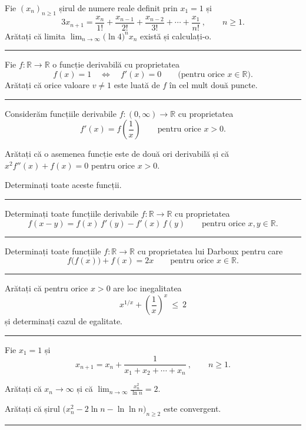 Fie $(x_n)_{n\ge1}$ șirul de numere reale definit prin $x_1=1$ și
\[ 3x_{n+1}=\frac{x_n}{1!}+\frac{x_{n-1}}{2!}+\frac{x_{n-2}}{3!}+\cdots+\frac{x_1}{n!}\ ,\qquad n\ge1 . \]
Arătați că limita $\displaystyle\lim_{n\to\infty}\bigl(\ln4\bigr)^{n}x_n$ există și calculați-o.
\vspace{1mm}\hrule

Fie $f:\mathbb{R}\to\mathbb{R}$ o funcție derivabilă cu proprietatea
\[ f(x)=1\quad\Longleftrightarrow\quad f'(x)=0\qquad\text{(pentru orice }x\in\mathbb{R}\text{)} . \]
Arătați că orice valoare $v\neq1$ este luată de $f$ în cel mult două puncte.
\vspace{1mm}\hrule

Considerăm funcțiile derivabile $f:(0,\infty)\to\mathbb{R}$ cu proprietatea
\[ f'(x)=f\!\left(\frac1x\right)\qquad\text{pentru orice }x>0 . \]
\begin{parti}
  \item Arătați că o asemenea funcție este de două ori derivabilă și că $x^{2}f''(x)+f(x)=0$ pentru orice $x>0$.
  \item Determinați toate aceste funcții.
\end{parti}
\vspace{1mm}\hrule

Determinați toate funcțiile derivabile $f:\mathbb{R}\to\mathbb{R}$ cu proprietatea
\[ f(x-y)=f(x)\,f'(y)-f'(x)\,f(y)\qquad\text{pentru orice }x,y\in\mathbb{R} . \]
\vspace{1mm}\hrule

Determinați toate funcțiile $f:\mathbb{R}\to\mathbb{R}$ cu proprietatea lui Darboux pentru care
\[ f\bigl(f(x)\bigr)+f(x)=2x\qquad\text{pentru orice }x\in\mathbb{R} . \]
\vspace{1mm}\hrule

Arătați că pentru orice $x>0$ are loc inegalitatea
\[ x^{1/x}+\left(\frac1x\right)^{x}\ \le\ 2 \]
și determinați cazul de egalitate.
\vspace{1mm}\hrule

Fie $x_1=1$ și
\[ x_{n+1}=x_n+\frac{1}{x_1+x_2+\cdots+x_n}\ ,\qquad n\ge1 . \]
\begin{parti}
  \item Arătați că $x_n\to\infty$ și că $\displaystyle\lim_{n\to\infty}\frac{x_n^{2}}{\ln n}=2$.
  \item Arătați că șirul $\bigl(x_n^{2}-2\ln n-\ln\ln n\bigr)_{n\ge2}$ este convergent.
\end{parti}
\vspace{1mm}\hrule


